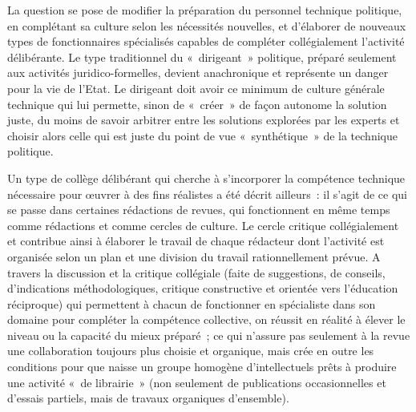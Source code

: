 \documentclass[french,twoside]{book} %
\begin{document}
La question se pose de modifier la préparation du personnel technique politique, en complétant sa culture selon les nécessités nouvelles, et d’élaborer de nouveaux types de fonctionnaires spécialisés capables de compléter collégialement l’activité délibérante. Le type traditionnel du « dirigeant » politique, préparé seulement aux activités juridico-formelles, devient anachronique et représente un danger pour la vie de l’Etat. Le dirigeant doit avoir ce minimum de culture générale technique qui lui permette, sinon de « créer » de façon autonome la solution juste, du moins de savoir arbitrer entre les solutions explorées par les experts et choisir alors celle qui est juste du point de vue « synthétique » de la technique politique.\par
Un type de collège délibérant qui cherche à s’incorporer la compétence technique nécessaire pour œuvrer à des fins réalistes a été décrit ailleurs : il s’agit de ce qui se passe dans certaines rédactions de revues, qui fonctionnent en même temps comme rédactions et comme cercles de culture. Le cercle critique collégialement et contribue ainsi à élaborer le travail de chaque rédacteur dont l’activité est organisée selon un plan et une division du travail rationnellement prévue. A travers la discussion et la critique collégiale (faite de suggestions, de conseils, d’indications méthodologiques, critique constructive et orientée vers l’éducation réciproque) qui permettent à chacun de fonctionner en spécialiste dans son domaine pour compléter la compétence collective, on réussit en réalité à élever le niveau ou la capacité du mieux préparé ; ce qui n’assure pas seulement à la revue une collaboration toujours plus choisie et organique, mais crée en outre les conditions pour que naisse un groupe homogène d’intellectuels prêts à produire une activité « de librairie » (non seulement de publications occasionnelles et d’essais partiels, mais de travaux organiques d’ensemble).\par
\end{document}
